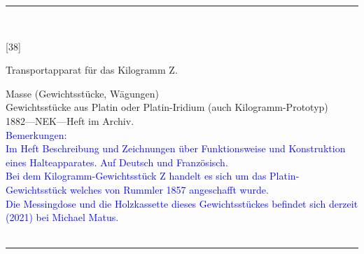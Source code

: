 \parbox{\textwidth}{%
\rule{\textwidth}{1pt}\vspace*{-3mm}\\
\begin{minipage}[t]{0.15\textwidth}\vspace{0pt}
\Huge\rule[-4mm]{0cm}{1cm}[38]
\end{minipage}
\hfill
\begin{minipage}[t]{0.85\textwidth}\vspace{0pt}
\large Transportapparat für das Kilogramm {\glqq}Z{\grqq}.\rule[-2mm]{0mm}{2mm}
\end{minipage}
{\footnotesize\flushright
Masse (Gewichtsstücke, Wägungen)\\
Gewichtsstücke aus Platin oder Platin-Iridium (auch Kilogramm-Prototyp)\\
}
1882\quad---\quad NEK\quad---\quad Heft im Archiv.\\
\textcolor{blue}{Bemerkungen:\\{}
Im Heft Beschreibung und Zeichnungen über Funktionsweise und Konstruktion eines Halteapparates. Auf Deutsch und Französisch.\\{}
Bei dem Kilogramm-Gewichtsstück {\glqq}Z{\grqq} handelt es sich um das Platin-Gewichtsstück welches von Rummler 1857 angeschafft wurde.\\{}
Die Messingdose und die Holzkassette dieses Gewichtsstückes befindet sich derzeit (2021) bei Michael Matus.\\{}
}
\\[-15pt]
\rule{\textwidth}{1pt}
}
\\
\vspace*{-2.5pt}\\

